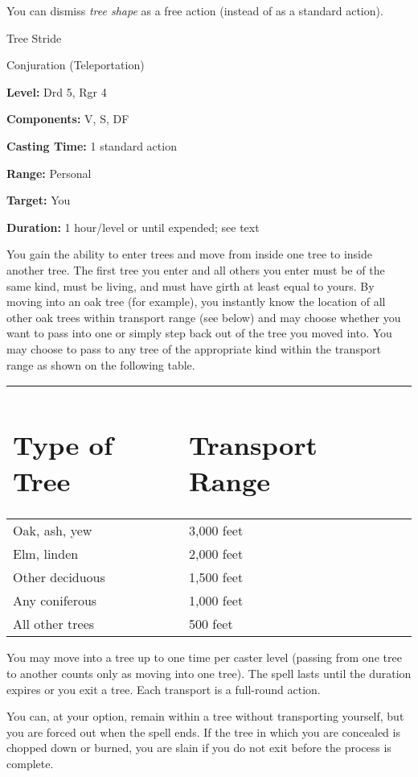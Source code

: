 \documentclass{article}
\begin{document}
You can dismiss \textit{tree shape }as a free action (instead of as a standard 
action).

\vspace{12pt}
Tree Stride

Conjuration (Teleportation)

\textbf{Level:} Drd 5, Rgr 4

\textbf{Components:} V, S, DF

\textbf{Casting Time:} 1 standard action

\textbf{Range:} Personal

\textbf{Target:} You

\textbf{Duration:} 1 hour/level or until expended; see text

You gain the ability to enter trees and move from inside one tree to inside another 
tree. The first tree you enter and all others you enter must be of the same kind, 
must be living, and must have girth at least equal to yours. By moving into an 
oak tree (for example), you instantly know the location of all other oak trees 
within transport range (see below) and may choose whether you want to pass into 
one or simply step back out of the tree you moved into. You may choose to pass 
to any tree of the appropriate kind within the transport range as shown on the 
following table.

\begin{tabular}{|>{\raggedright}p{64pt}|>{\raggedright}p{72pt}|}
\hline
\section*{T\textbf{ype of Tree}} & \section*{T\textbf{ransport Range}}\tabularnewline
\hline
Oak, ash, yew & 3,000 feet\tabularnewline
\hline
Elm, linden & 2,000 feet\tabularnewline
\hline
Other deciduous & 1,500 feet\tabularnewline
\hline
Any coniferous & 1,000 feet\tabularnewline
\hline
All other trees & 500 feet\tabularnewline
\hline
\end{tabular}

You may move into a tree up to one time per caster level (passing from one tree 
to another counts only as moving into one tree). The spell lasts until the duration 
expires or you exit a tree. Each transport is a full-round action.

You can, at your option, remain within a tree without transporting yourself, but 
you are forced out when the spell ends. If the tree in which you are concealed 
is chopped down or burned, you are slain if you do not exit before the process 
is complete.
\end{document}
